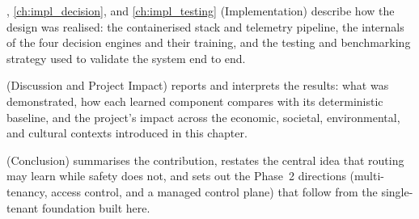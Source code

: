 , \cref{ch:impl_decision}, and \cref{ch:impl_testing}
(Implementation) describe how the design was realised: the containerised stack
and telemetry pipeline, the internals of the four decision engines and their
training, and the testing and benchmarking strategy used to validate the system
end to end.

 (Discussion and Project Impact) reports and interprets the
results: what was demonstrated, how each learned component compares with its
deterministic baseline, and the project's impact across the economic, societal,
environmental, and cultural contexts introduced in this chapter.

 (Conclusion) summarises the contribution, restates the
central idea that routing may learn while safety does not, and sets out the
Phase~2 directions (multi-tenancy, access control, and a managed control plane)
that follow from the single-tenant foundation built here.
